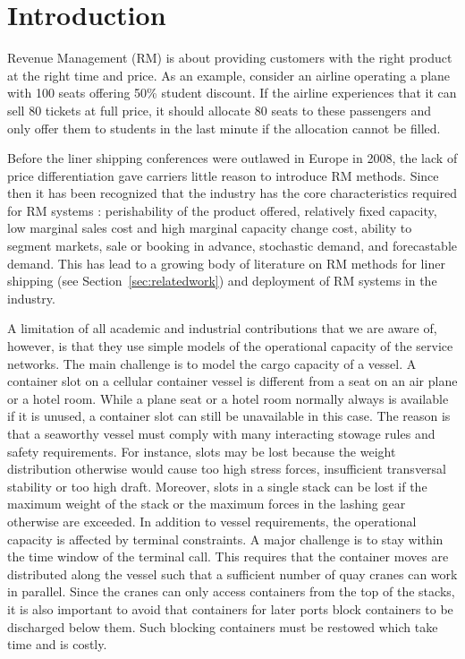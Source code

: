 \section{Introduction}

Revenue Management (RM) is about providing customers with the right product at the right time and price. As an example, consider an airline operating a plane with 100 seats offering 50\% student discount. If the airline experiences that it can sell 80 tickets at full price, it should allocate 80 seats to these passengers and only offer them to students in the last minute if the allocation cannot be filled.

Before the liner shipping conferences were outlawed in Europe in 2008, the lack of price differentiation gave carriers little reason to introduce RM methods. Since then it has been recognized that the industry has the core characteristics required for RM systems \cite{Hellerman06}: perishability of the product offered, relatively fixed capacity, low marginal sales cost and high marginal capacity change cost, ability to segment markets, sale or booking in advance, stochastic demand, and forecastable demand. This has lead to a growing body of literature on RM methods for liner shipping (see Section~\ref{sec:relatedwork}) and deployment of RM systems in the industry.

A limitation of all academic and industrial contributions that we are aware of, however, is that they use simple models of the operational capacity of the service networks. The main challenge is to model the cargo capacity of a vessel. A container slot on a cellular container vessel is different from a seat on an air plane or a hotel room. While a plane seat or a hotel room normally always is available if it is unused, a container slot can still be unavailable in this case. The reason is that a seaworthy vessel must comply with many interacting stowage rules and safety requirements. For instance, slots may be lost because the weight distribution otherwise would cause too high stress forces, insufficient transversal stability or too high draft. Moreover, slots in a single stack can be lost if the maximum weight of the stack or the maximum forces in the lashing gear otherwise are exceeded. In addition to vessel requirements, the operational capacity is affected by terminal constraints. A major challenge is to stay within the time window of the terminal call. This requires that the container moves are distributed along the vessel such that a sufficient number of quay cranes can work in parallel. Since the cranes can only access containers from the top of the stacks, it is also important to avoid that containers for later ports block containers to be discharged below them. Such blocking containers must be restowed which take time and is costly.

